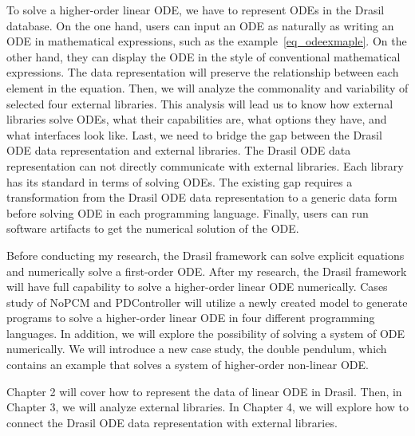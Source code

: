 To solve a higher-order linear ODE, we have to represent ODEs in the Drasil database. On the one hand, users can input an ODE as naturally as writing an ODE in mathematical expressions, such as the example~\ref{eq_odeexmaple}. On the other hand, they can display the ODE in the style of conventional mathematical expressions. The data representation will preserve the relationship between each element in the equation. Then, we will analyze the commonality and variability of selected four external libraries. This analysis will lead us to know how external libraries solve ODEs, what their capabilities are, what options they have, and what interfaces look like. Last, we need to bridge the gap between the Drasil ODE data representation and external libraries. The Drasil ODE data representation can not directly communicate with external libraries. Each library has its standard in terms of solving ODEs. The existing gap requires a transformation from the Drasil ODE data representation to a generic data form before solving ODE in each programming language. Finally, users can run software artifacts to get the numerical solution of the ODE.

Before conducting my research, the Drasil framework can solve explicit equations and numerically solve a first-order ODE. After my research, the Drasil framework will have full capability to solve a higher-order linear ODE numerically. Cases study of NoPCM and PDController will utilize a newly created model to generate programs to solve a higher-order linear ODE in four different programming languages. In addition, we will explore the possibility of solving a system of ODE numerically. We will introduce a new case study, the double pendulum, which contains an example that solves a system of higher-order non-linear ODE.

Chapter 2 will cover how to represent the data of linear ODE in Drasil. Then, in Chapter 3, we will analyze external libraries. In Chapter 4, we will explore how to connect the Drasil ODE data representation with external libraries.